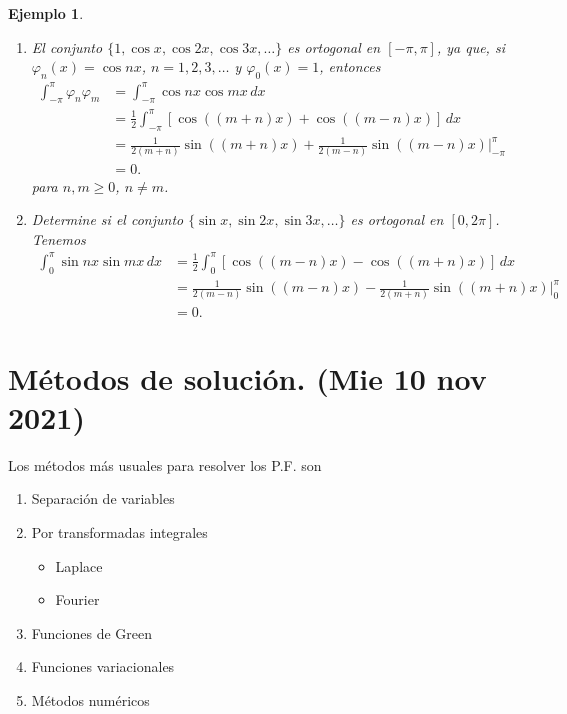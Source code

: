 \documentclass[11pt,letterpaper,draft]{report}
\newtheorem{example}{Ejemplo}[section]
\newcommand\<{\langle}
\renewcommand\>{\rangle}
\renewcommand\phi\varphi
\begin{document}
\begin{example}
  \begin{enumerate}
    \item   
    El conjunto $\{1,\cos x,\cos 2x,\cos 3x,\dots\}$ es ortogonal
    en $[-\pi,\pi]$, ya que, si $\phi_n(x)=\cos nx$,
    $n=1,2,3,\dots$ y $\phi_0(x)=1$, entonces
    \begin{align*}
      \int_{-\pi}^\pi \phi_n\phi_m
      &= \int_{-\pi}^\pi \cos nx \cos mx \,dx \\
      &= \frac{1}{2}
        \int_{-\pi}^\pi [\cos((m+n)x) + \cos((m-n)x)] \,dx \\
      &= \frac{1}{2(m+n)}\sin((m+n)x) + \frac{1}{2(m-n)}\sin((m-n)x)
      |_{-\pi}^\pi \\
      &= 0.
    \end{align*}
    para $n,m\geq 0$, $n\neq m$.

    \item Determine si el conjunto $\{\sin x,\sin 2x,\sin
    3x,\dots\}$ es ortogonal en $[0,2\pi]$.
    Tenemos
    \begin{align*}
      \int_0^\pi \sin nx\sin mx \,dx
      &= \frac{1}{2}\int_0^\pi[\cos((m-n)x)-\cos((m+n)x)] \,dx \\
      &= \frac{1}{2(m-n)}\sin((m-n)x)
        - \frac{1}{2(m+n)}\sin((m+n)x) |_0^\pi \\
      &= 0.
    \end{align*}
  \end{enumerate}
\end{example}

\chapter{Métodos de solución. (Mie 10 nov 2021)}

Los métodos más usuales para resolver los P.F. son
\begin{enumerate}
  \item Separación de variables
  \item Por transformadas integrales
  \begin{itemize}
    \item   Laplace
    \item Fourier   
  \end{itemize}
  \item Funciones de Green
  \item Funciones variacionales
  \item Métodos numéricos
\end{enumerate}
\end{document}
